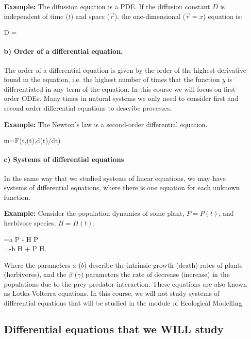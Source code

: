 {\bf Example: } The difussion equation is a PDE. If the diffusion constant $D$ is independent of time ($t$) and space ($\vec{r}$), the one-dimensional ($\vec{r}=x$)  equation is:

\bnn D =  \enn

\paragraph{b) Order of a differential equation.}
The order of a differential equation is given by the order of the highest derivative found in the equation, i.e. the highest number of times that the function $y$ is differentiated in any term of the equation. In this course we
will focus on first-order ODEs. Many times in natural systems we only need to consider first and second order differential equations to describe processes.

{\bf Example: } The Newton's law is a second-order differential equation.

\bnn m=F(t,(t),d(t)/dt) \enn

\paragraph{c) Systems of differential equations}

In the same way that we studied systems of linear equations, we may have
systems of differential equations, where there is one equation for each unknown function. 

{\bf Example:} Consider the population dynamics of some plant, $P=P(t)$, and herbivore species,  $H=H(t)$:

\bnn {}=a P - \beta H P \\
     =-b H + \gamma P H. \enn
     
Where the parameters $a$ ($b$) describe the intrinsic growth (death) rates of plants (herbivores), and the $\beta$ ($\gamma$) parameters the rate of decrease (increase) in the populations due to the prey-predator interaction. These equations are also known as Lotka-Volterra equations. In this course, we will not study systems of differential equations that will be studied in the module of Ecological Modelling.


\subsection{Differential equations that we WILL study}

